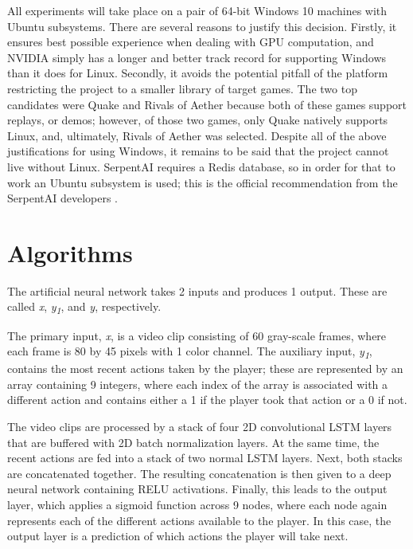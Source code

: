 All experiments will take place on a pair of 64-bit Windows 10 machines with Ubuntu subsystems. There are several reasons to justify this decision. Firstly, it ensures best possible experience when dealing with GPU computation, and NVIDIA simply has a longer and better track record for supporting Windows than it does for Linux. Secondly, it avoids the potential pitfall of the platform restricting the project to a smaller library of target games. The two top candidates were Quake and Rivals of Aether because both of these games support replays, or demos; however, of those two games, only Quake natively supports Linux, and, ultimately, Rivals of Aether was selected. Despite all of the above justifications for using Windows, it remains to be said that the project cannot live without Linux. SerpentAI requires a Redis database, so in order for that to work an Ubuntu subsystem is used; this is the official recommendation from the SerpentAI developers \cite{SerpentAI}.




\section{Algorithms}

The artificial neural network takes 2 inputs and produces 1 output. These are called \textit{x}, \textit{y\textsubscript{1}}, and \textit{y}, respectively.

The primary input, \textit{x}, is a video clip consisting of 60 gray-scale frames, where each frame is 80 by 45 pixels with 1 color channel. The auxiliary input, \textit{y\textsubscript{1}}, contains the most recent actions taken by the player; these are represented by an array containing 9 integers, where each index of the array is associated with a different action and contains either a 1 if the player took that action or a 0 if not.

The video clips are processed by a stack of four 2D convolutional LSTM layers that are buffered with 2D batch normalization layers. At the same time, the recent actions are fed into a stack of two normal LSTM layers. Next, both stacks are concatenated together. The resulting concatenation is then given to a deep neural network containing RELU activations. Finally, this leads to the output layer, which applies a sigmoid function across 9 nodes, where each node again represents each of the different actions available to the player. In this case, the output layer is a prediction of which actions the player will take next.

